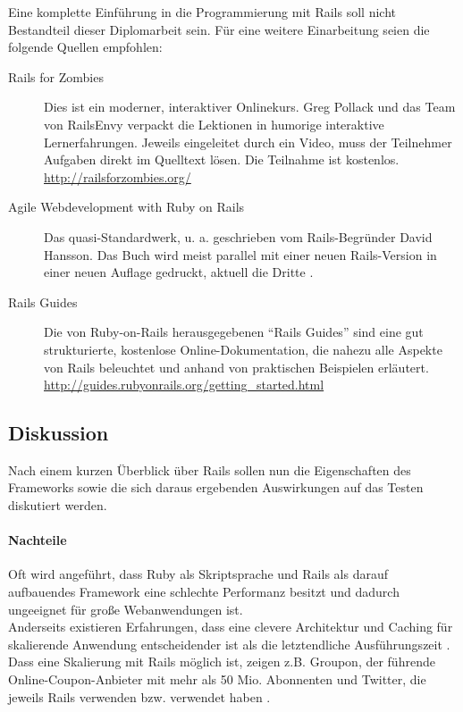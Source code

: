 Eine komplette Einführung in die Programmierung mit Rails soll nicht Bestandteil dieser Diplomarbeit sein. Für eine weitere Einarbeitung seien die folgende Quellen empfohlen:
\begin{description}
 \item[Rails for Zombies] Dies ist ein moderner, interaktiver Onlinekurs. Greg Pollack und das Team von RailsEnvy verpackt die Lektionen in humorige interaktive Lernerfahrungen. Jeweils eingeleitet durch ein Video, muss der Teilnehmer Aufgaben direkt im Quelltext lösen. Die Teilnahme ist kostenlos.\\
 \url{http://railsforzombies.org/}
 \item[Agile Webdevelopment with Ruby on Rails] Das quasi-Standardwerk, u. a. geschrieben vom Rails-Begründer David Hansson. Das Buch wird meist parallel mit einer neuen Rails-Version in einer neuen Auflage gedruckt, aktuell die Dritte \citep{ruby_agile_2009}.
 \item[Rails Guides] Die von Ruby-on-Rails herausgegebenen "`Rails Guides"' sind eine gut strukturierte, kostenlose Online-Dokumentation, die nahezu alle Aspekte von Rails beleuchtet und anhand von praktischen Beispielen erläutert.\\
 \url{http://guides.rubyonrails.org/getting_started.html}
 \end{description}



\subsection{Diskussion}
Nach einem kurzen Überblick über Rails sollen nun die Eigenschaften des Frameworks sowie die sich daraus ergebenden Auswirkungen auf das Testen diskutiert werden.

\paragraph{Nachteile}

Oft wird angeführt, dass Ruby als Skriptsprache und Rails als darauf aufbauendes Framework eine schlechte Performanz besitzt und dadurch ungeeignet für große Webanwendungen ist.\\
Anderseits existieren Erfahrungen, dass eine clevere Architektur und Caching für skalierende Anwendung entscheidender ist als die letztendliche Ausführungszeit \citep{kirk_haines_ruby_2010}.
Dass eine Skalierung mit Rails möglich ist, zeigen z.B. Groupon, der führende Online-Coupon-Anbieter mit mehr als 50 Mio. Abonnenten und Twitter, die jeweils Rails verwenden bzw. verwendet haben \citep{ruby_on_rails_2011}.

